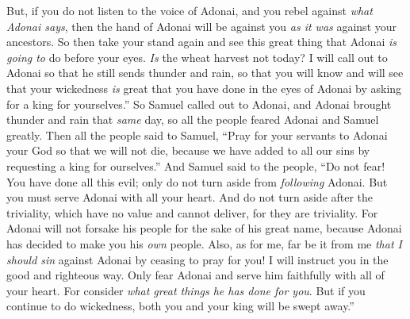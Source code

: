 \begin{biblechapter}
\verse But, if you do not listen to the voice of Adonai, and you rebel against \textit{what Adonai says}, then the hand of Adonai will be against you \textit{as it was} against your ancestors.
\verse So then take your stand again and see this great thing that Adonai \textit{is going to} do before your eyes.
\verse \textit{Is} the wheat harvest not today? I will call out to Adonai so that he still sends thunder and rain, so that you will know and will see that your wickedness \textit{is} great that you have done in the eyes of Adonai by asking for a king for yourselves.”
\verse So Samuel called out to Adonai, and Adonai brought thunder and rain that \textit{same} day, so all the people feared Adonai and Samuel greatly.
\verse Then all the people said to Samuel, “Pray for your servants to Adonai your God so that we will not die, because we have added to all our sins by requesting a king for ourselves.”
\verse And Samuel said to the people, “Do not fear! You have done all this evil; only do not turn aside from \textit{following} Adonai. But you must serve Adonai with all your heart.
\verse And do not turn aside after the triviality, which have no value and cannot deliver, for they are triviality.
\verse For Adonai will not forsake his people for the sake of his great name, because Adonai has decided to make you his \textit{own} people.
\verse Also, as for me, far be it from me \textit{that I should sin} against Adonai by ceasing to pray for you! I will instruct you in the good and righteous way.
\verse Only fear Adonai and serve him faithfully with all of your heart. For consider \textit{what great things he has done for you}.
\verse But if you continue to do wickedness, both you and your king will be swept away.”
\end{biblechapter}

